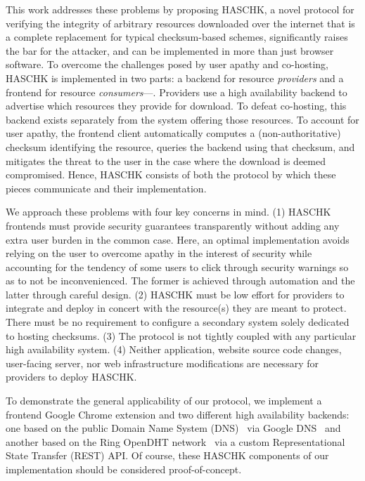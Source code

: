 This work addresses these problems by proposing HASCHK, a novel protocol for
verifying the integrity of arbitrary resources downloaded over the internet that
is a complete replacement for typical checksum-based schemes, significantly
raises the bar for the attacker, and can be implemented in more than just
browser software. To overcome the challenges posed by user apathy and
co-hosting, HASCHK is implemented in two parts: a backend for resource
\emph{providers} and a frontend for resource \emph{consumers}---. Providers use a high availability backend to advertise which resources
they provide for download. To defeat co-hosting, this backend exists separately
from the system offering those resources. To account for user apathy, the
frontend client automatically computes a (non-authoritative) checksum
identifying the resource, queries the backend using that checksum, and mitigates
the threat to the user in the case where the download is deemed compromised.
Hence, HASCHK consists of both the protocol by which these pieces communicate
and their implementation.

We approach these problems with four key concerns in mind. (1) HASCHK
frontends must provide security guarantees transparently without adding any
extra user burden in the common case. Here, an optimal implementation avoids
relying on the user to overcome apathy in the interest of security while
accounting for the tendency of some users to click through security warnings so
as to not be inconvenienced. The former is achieved through automation and the
latter through careful design. (2) HASCHK must be low effort for providers to
integrate and deploy in concert with the resource(s) they are meant to protect.
There must be no requirement to configure a secondary system solely dedicated to
hosting checksums. (3) The protocol is not tightly coupled with any particular
high availability system. (4) Neither application, website source code changes,
user-facing server, nor web infrastructure modifications are necessary for
providers to deploy HASCHK.

To demonstrate the general applicability of our protocol, we implement a
frontend Google Chrome extension and two different high availability backends:
one based on the public Domain Name System (DNS)~\cite{DNS1, DNS2} via Google
DNS~\cite{GoogleDNS} and another based on the Ring OpenDHT
network~\cite{OpenDHT, savoirfairelinux} via a custom Representational State
Transfer (REST) API. Of course, these HASCHK components of our implementation
should be considered proof-of-concept.

